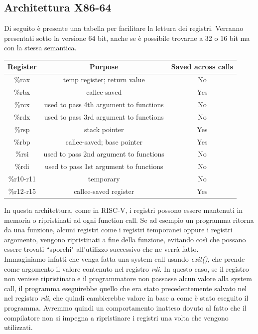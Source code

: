 \subsection*{Architettura X86-64}
Di seguito è presente una tabella per facilitare la lettura dei registri. Verranno presentati sotto la versione 64 bit, anche se è possibile trovarne a 32 o 16 bit ma con la stessa semantica.
\vspace{1cm}
\begin{center}
\begin{tabular}{| c | c c|} 
 \hline
 \textbf{Register} & \textbf{Purpose} & \textbf{Saved across calls} \\ [0.5ex] 
 \hline\hline
 \%rax & temp register; return value & No \\ 
 \hline
 \%rbx & callee-saved  & Yes \\ 
 \hline
 \%rcx & used to pass 4th argument to functions & No \\ 
 \hline
 \%rdx & used to pass 3rd argument to functions & No \\ 
 \hline
 \%rsp & stack pointer & Yes \\ 
 \hline
 \%rbp & callee-saved; base pointer & Yes \\ 
 \hline
 \%rsi & used to pass 2nd argument to functions & No \\ 
 \hline
 \%rdi & used to pass 1st argument to functions & No \\ 
 \hline
 \%r10-r11 & temporary & No \\ 
 \hline
 \%r12-r15 & callee-saved register & Yes \\ 
 \hline
\end{tabular} 
\end{center}
\vspace{1cm}
In questa architettura, come in RISC-V, i registri possono essere mantenuti in memoria o ripristinati ad ogni function call. Se ad esempio un programma ritorna da una funzione, alcuni registri come i registri temporanei oppure i registri argomento, vengono ripristinati a fine della funzione, evitando così che possano essere trovati ``sporchi" all'utilizzo successivo che ne verrà fatto.\\
Immaginiamo infatti che venga fatta una system call usando \textit{exit()}, che prende come argomento il valore contenuto nel registro \textit{rdi}. In questo caso, se il registro non venisse ripristinato e il programmatore non passasse alcun valore alla system call, il programma eseguirebbe quello che era stato precedentemente salvato nel nel registro \textit{rdi}, che quindi cambierebbe valore in base a come è stato eseguito il programma. Avremmo quindi un comportamento inatteso dovuto al fatto che il compilatore non si impegna a ripristinare i registri una volta che vengono utilizzati.\\
